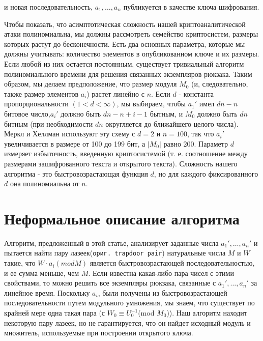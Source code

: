 \documentclass[a4paper,12pt]{report}
\newcommand{\mono}[1]{{\small\texttt{#1}}}
\begin{document}
\noindent и новая последовательность, $a_1,\ldots,a_n$ публикуется в качестве ключа шифрования.

Чтобы показать, что асимптотическая сложность нашей криптоаналитической атаки полиномиальна, мы должны рассмотреть семейство криптосистем, размеры которых растут до бесконечности. Есть два основных параметра, которые мы должны учитывать: количество элементов в опубликованном ключе и их размеры. Если любой из них остается постоянным, существует тривиальный алгоритм полиномиального времени для решения связанных экземпляров рюкзака. Таким образом, мы делаем предположение, что размер модуля $M_0$ (и, следовательно, также размер элементов $a_i$) растет линейно с $n$. Если $d$ - константа пропорциональности $(1 < d < \infty)$, мы выбираем, чтобы $a_1'$ имел $dn - n$ битовое число,$a_i'$ должно быть $dn - n + i - 1$ бытным, и $M_0$ должно быть $dn$ битным (при необходимости $dn$ округляется до ближайшего целого числа). Меркл и Хеллман используют эту схему с $d = 2$ и $n = 100$, так что $a_i'$ увеличивается в размере от 100 до 199 бит, а $|M_0|$ равно 200. Параметр $d$ измеряет избыточность, введенную криптосистемой (т. е. соотношение между размерами зашифрованного текста и открытого текста). Сложность нашего алгоритма - это быстровозрастающая функция $d$, но для каждого фиксированного $d$ она полиномиальна от $n$.

\chapter{Неформальное описание алгоритма}\label{ch::informal}

Алгоритм, предложенный в этой статье, анализирует заданные числа $a_1',\ldots,a_n'$ и пытается найти пару лазеек(\mono{ориг. trapdoor pair}) натуральные числа $M$ и $W$ такие, что $W \cdot a_i (mod M)$ является быстровозрастающей последовательностью, и ее сумма меньше, чем $M$. Если известна какая-либо пара чисел с этими свойствами, то можно решить все экземпляры рюкзака, связанные с $a_1',\ldots,a_n'$ за линейное время. Поскольку $a_i$, были получены из быстровозрастающей последовательности путем модульного умножения, мы знаем, что существует по крайней мере одна такая пара (с $W_0 \equiv U_0^{-1}$(mod $M_0$)). Наш алгоритм находит некоторую пару лазеек, но не гарантируется, что он найдет исходный модуль и множитель, используемые при построении открытого ключа.
\end{document}
